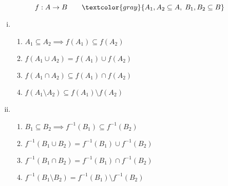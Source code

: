 \begin{frame}{}
  \begin{theorem}
    \[
      f: A \to B \qquad \textcolor{gray}{A_1, A_2 \subseteq A,\; B_1, B_2 \subseteq B}
    \]

    \vspace{-0.10cm}
    \begin{enumerate}[(i)]
      \setlength{\itemsep}{10pt}
      \item {}
	\begin{enumerate}[(1)]
	  \setlength{\itemsep}{4pt}
	  \item $A_1 \subseteq A_2 \implies f(A_1) \subseteq f(A_2)$
	  \item $f(A_1 \cup A_2) = f(A_1) \cup f(A_2)$
	  \item $f(A_1 \cap A_2) \subseteq f(A_1) \cap f(A_2)$
	  \item $f(A_1 \setminus A_2) \subseteq f(A_1) \setminus f(A_2)$
	\end{enumerate}
      \item {}
	\begin{enumerate}[(1)]
	  \setlength{\itemsep}{4pt}
	  \setcounter{enumii}{4}
	  \item $B_1 \subseteq B_2 \implies f^{-1}(B_1) \subseteq f^{-1}(B_2)$
	  \item $f^{-1}(B_1 \cup B_2) = f^{-1}(B_1) \cup f^{-1}(B_2)$
	  \item $f^{-1}(B_1 \cap B_2) = f^{-1}(B_1) \cap f^{-1}(B_2)$
	  \item $f^{-1}(B_1 \setminus B_2) = f^{-1}(B_1) \setminus f^{-1}(B_2)$
	\end{enumerate}
    \end{enumerate}
  \end{theorem}
\end{frame}

